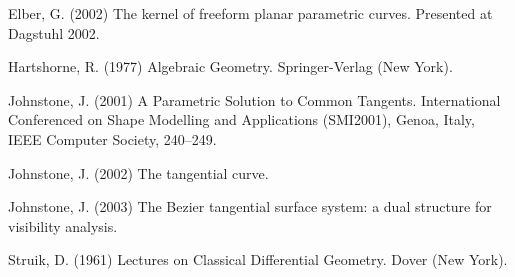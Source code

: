 \documentclass[12pt]{article}
\begin{document}

\begin{thebibliography}{99}

Elber, G. (2002)
The kernel of freeform planar parametric curves.
Presented at Dagstuhl 2002.

Hartshorne, R. (1977) 
Algebraic Geometry.
Springer-Verlag (New York).

Johnstone, J. (2001)
A Parametric Solution to Common Tangents.
International Conferenced on Shape Modelling and Applications (SMI2001),
Genoa, Italy, IEEE Computer Society, 240--249.

Johnstone, J. (2002)
The tangential curve.

Johnstone, J. (2003)
The Bezier tangential surface system: a dual structure for visibility analysis.

Struik, D. (1961)
Lectures on Classical Differential Geometry.
Dover (New York).

\end{thebibliography}
\end{document}
